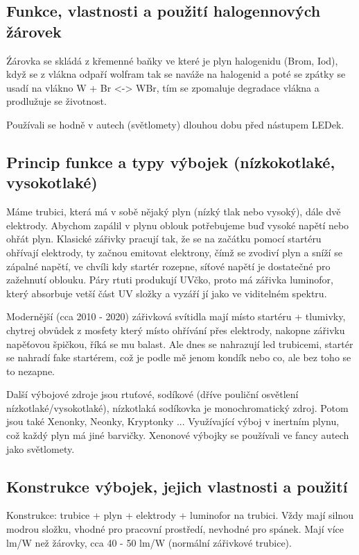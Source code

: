 \documentclass[a4paper, 12pt]{article}
\begin{document}
        \subsection{Funkce, vlastnosti a použití halogennových žárovek}
            Źárovka se skládá z křemenné baňky ve které je plyn halogenidu (Brom, Iod), když se z vlákna odpaří wolfram tak se naváže na halogenid
            a poté se zpátky se usadí na vlákno W + Br <-> WBr, tím se zpomaluje degradace vlákna a prodlužuje se životnost.

            Používali se hodně v autech (světlomety) dlouhou dobu před nástupem LEDek.
        \subsection{Princip funkce a typy výbojek (nízkokotlaké, vysokotlaké)}
            Máme trubici, která má v sobě nějaký plyn (nízký tlak nebo vysoký),
            dále dvě elektrody. Abychom zapálil v plynu oblouk potřebujeme buď vysoké napětí nebo ohřát plyn.
            Klasické zářivky pracují tak, že se na začátku pomocí startéru ohřívají elektrody, ty začnou emitovat elektrony, čímž
            se zvodiví plyn a sníží se zápalné napětí, ve chvíli kdy startér rozepne, síťové napětí je dostatečné pro zažehnutí oblouku.
            Páry rtuti produkují UVčko, proto má zářivka luminofor, který absorbuje vetší část UV složky a vyzáří jí jako ve viditelném spektru.

            Modernější (cca 2010 - 2020) zářivková svítidla mají místo startéru + tlumivky,
            chytrej obvůdek z mosfety který místo ohřívání přes elektrody, nakopne zářivku napěťovou špičkou, říká se mu balast.
            Ale dnes se nahrazují led trubicemi, startér se nahradí fake startérem, což je podle mě jenom kondík nebo co, ale bez toho se to nezapne.

            Další výbojové zdroje jsou rtuťové, sodíkové (dříve pouliční osvětlení nízkotlaké/vysokotlaké), nízkotlaká sodíkovka je monochromatický zdroj.
            Potom jsou také Xenonky, Neonky, Kryptonky ... Využívající výboj v inertním plynu, což každý plyn má jiné barvičky.
            Xenonové výbojky se používali ve fancy autech jako světlomety.
        
        \subsection{Konstrukce výbojek, jejich vlastnosti a použití}
            Konstrukce: trubice + plyn + elektrody + luminofor na trubici.
            Vždy mají silnou modrou složku, vhodné pro pracovní prostředí, nevhodné pro spánek.
            Mají více lm/W než žárovky, cca 40 - 50 lm/W (normální zářivkové trubice).
\end{document}
